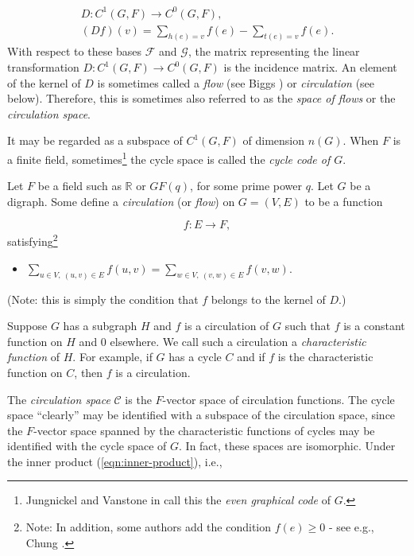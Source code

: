 \[
\begin{array}{c}
D:C^1(G,F)\to C^0(G,F),\\
(Df)(v) = \sum_{h(e)=v} f(e) - \sum_{t(e)=v} f(e).
\end{array}
\]
With respect to these bases ${\mathcal F}$ and
${\mathcal G}$, the matrix
representing the linear transformation $D:C^1(G,F)\to C^0(G,F)$
is the incidence matrix. An element of the kernel of $D$ is
sometimes called a {\it flow} (see Biggs \cite{Biggs1997})
or {\it circulation} (see below).
Therefore, this is sometimes also referred to as the
{\it space of flows} or the {\it circulation space}.

It may be regarded as a subspace of $C^1(G,F)$ of dimension $n(G)$.
When $F$ is a finite field, sometimes\footnote{Jungnickel and
Vanstone in \cite{JungnickelVanstone1997} call
this the {\it even graphical code} of $G$.}
the cycle space is called the {\it cycle code of $G$}.


Let $F$ be a field such as ${\mathbb{R}}$ or $GF(q)$, for some prime
power $q$. Let $G$ be a digraph.
Some define a {\it circulation} (or {\it flow}) on $G=(V,E)$
to be a function

\[
f:E\to F,
\]
satisfying\footnote{Note: In addition, some authors add the
condition $f(e)\geq 0$ - see e.g., Chung \cite{Chung2005}.}

\begin{itemize}
\item
$\sum_{u\in V,\ (u,v)\in E} f(u,v) = \sum_{w\in V,\ (v,w)\in E} f(v, w)$.
\end{itemize}
(Note: this is simply the condition that $f$ belongs to the
kernel of $D$.)

Suppose $G$ has a subgraph $H$ and
$f$ is a circulation of $G$ such that $f$ is a constant function
on $H$ and $0$ elsewhere. We call such a circulation a
{\it characteristic function} of $H$.
For example, if $G$ has a cycle $C$ and if $f$ is the
characteristic function on $C$, then $f$ is a circulation.

The {\it circulation space} ${\mathcal C}$ is the $F$-vector space of
circulation functions.
The cycle space ``clearly'' may be identified with
a subspace of the circulation space,
since the $F$-vector space spanned by the characteristic
functions of cycles may be identified with the cycle space of $G$.
In fact, these spaces are isomorphic.
Under the inner product (\ref{eqn:inner-product}), i.e.,


